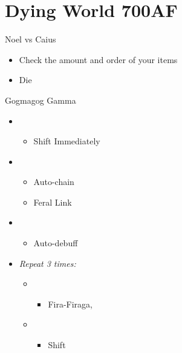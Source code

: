 \chapter{Dying World 700AF}

\begin{battle}{Noel vs Caius}
	\begin{itemize}
		\item Check the amount and order of your items
		\item Die
	\end{itemize}
\end{battle}


\begin{battle}{Gogmagog Gamma}
	\begin{flushleft}
		\begin{itemize}
			\item \sixth
			      \begin{itemize}
				      \item Shift Immediately
			      \end{itemize}
			\item \second
			      \begin{itemize}
				      \item Auto-chain
				      \item Feral Link
			      \end{itemize}
			\item \third
			      \begin{itemize}
				      \item Auto-debuff
			      \end{itemize}
			\item \textit{Repeat 3 times:}
			      \begin{itemize}
				      \item \fifth
				            \begin{itemize}
					            \item Fira-Firaga, \comb
				            \end{itemize}
				      \item \first
				            \begin{itemize}
					            \item Shift
				            \end{itemize}
			      \end{itemize}
		\end{itemize}
	\end{flushleft}
\end{battle}

\newline